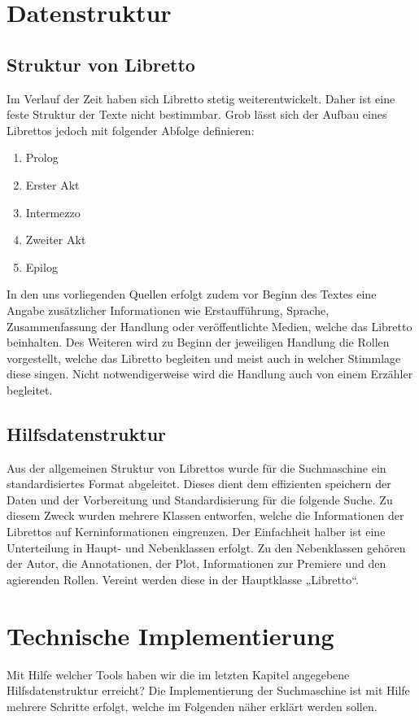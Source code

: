 \section{Datenstruktur}

\subsection{Struktur von Libretto}
Im Verlauf der Zeit haben sich Libretto stetig weiterentwickelt. Daher ist eine feste Struktur der Texte nicht bestimmbar. Grob lässt sich der Aufbau eines Librettos jedoch mit folgender Abfolge definieren:
\begin{enumerate}
    \item Prolog
    \item Erster Akt
    \item Intermezzo
    \item Zweiter Akt
    \item Epilog
\end{enumerate}
In den uns vorliegenden Quellen erfolgt zudem vor Beginn des Textes eine Angabe zusätzlicher Informationen wie Erstaufführung, Sprache, Zusammenfassung der Handlung oder veröffentlichte Medien, welche das Libretto beinhalten. Des Weiteren wird zu Beginn der jeweiligen Handlung die Rollen vorgestellt, welche das Libretto begleiten und meist auch in welcher Stimmlage diese singen. Nicht notwendigerweise wird die Handlung auch von einem Erzähler begleitet.

\subsection{Hilfsdatenstruktur}
Aus der allgemeinen Struktur von Librettos wurde für die Suchmaschine ein standardisiertes Format abgeleitet. Dieses dient dem effizienten speichern der Daten und der Vorbereitung und Standardisierung für die folgende Suche. Zu diesem Zweck wurden mehrere Klassen entworfen, welche die Informationen der Librettos auf Kerninformationen eingrenzen. Der Einfachheit halber ist eine Unterteilung in Haupt- und Nebenklassen erfolgt. Zu den Nebenklassen gehören der Autor, die Annotationen, der Plot, Informationen zur Premiere und den agierenden Rollen. Vereint werden diese in der Hauptklasse „Libretto“.

\section{Technische Implementierung}
Mit Hilfe welcher Tools haben wir die im letzten Kapitel angegebene Hilfsdatenstruktur erreicht? Die Implementierung der Suchmaschine ist mit Hilfe mehrere Schritte erfolgt, welche im Folgenden näher erklärt werden sollen.

